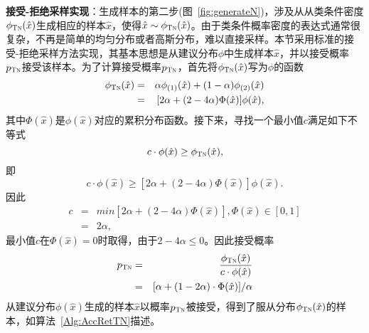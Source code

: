
\textbf{接受-拒绝采样实现}：生成样本的第二步(图~\ref{fig:generateN})，涉及从从类条件密度$\phi_{\textsc{Tn}}(\hat{x})$生成相应的样本$\hat{x}$，使得$\hat{x} \sim \phi_{\textsc{Tn}}(\hat{x})$。由于类条件概率密度的表达式通常很复杂，不再是简单的均匀分布或者高斯分布，难以直接采样。本节采用标准的接受-拒绝采样方法实现，其基本思想是从建议分布$\phi$中生成样本$\hat{x}$，并以接受概率$p_{\textsc{Tn}}$接受该样本。为了计算接受概率$p_{\textsc{Tn}}$，首先将$\phi_{\textsc{Tn}}(\hat{x})$写为$\phi$的函数
\begin{eqnarray}
	\phi_{\textsc{Tn}}(\hat{x}) &=& \alpha \phi_{(1)}(\hat{x}) + (1-\alpha)\phi_{(2)}(\hat{x}) \nonumber\\
	&=& [2\alpha+(2-4\alpha)\Phi(\hat{x})]\phi(\hat x), \nonumber
\end{eqnarray}
其中$\Phi(\hat{x})$是$\phi(\hat{x})$对应的累积分布函数。接下来，寻找一个最小值$c$满足如下不等式
\[c \cdot \phi(\hat{x}) \geq \phi_{\textsc{Tn}}(\hat{x}),\]
即
\[c \cdot \phi(\hat{x}) \geq  [2\alpha+(2-4\alpha)\Phi(\hat{x})]\phi(\hat x).\]
因此
\begin{eqnarray}
	c &=& min [2\alpha+(2-4\alpha)\Phi(\hat{x})], \Phi(\hat{x}) \in [0,1]\nonumber\\
	&=&2\alpha, \nonumber
\end{eqnarray}
最小值$c$在$\Phi(\hat{x})=0$时取得，由于$2-4\alpha \leq 0$。因此接受概率
\begin{eqnarray}
	p_{\textsc{Tn}} &=& \frac{\phi_{\textsc{Tn}}(\hat{x})}{c \cdot \phi(\hat{x}) } \nonumber \\
	&=& [\alpha + (1-2 \alpha)\cdot \Phi(\hat{x})] /\alpha \nonumber
\end{eqnarray}
从建议分布$\phi(\hat{x})$生成的样本$\hat{x}$以概率$p_{\textsc{Tn}}$被接受，得到了服从分布$ \phi_{\textsc{Tn}}(\hat{x})$的样本，如算法~\ref{Alg:AccRetTN}描述。
